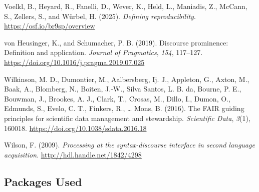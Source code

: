 \documentclass[
  letterpaper,
  DIV=11,
  numbers=noendperiod]{scrartcl}
\newlength{\cslhangindent}
\newenvironment{CSLReferences}[2] %
 {\begin{list}{}{%
  \setlength{\itemindent}{0pt}
  \setlength{\leftmargin}{0pt}
  \setlength{\parsep}{0pt}
  \ifodd #1
   \setlength{\leftmargin}{\cslhangindent}
   \setlength{\itemindent}{-1\cslhangindent}
  \fi
  \setlength{\itemsep}{#2\baselineskip}}}
 {\end{list}}
\begin{document}
\begin{CSLReferences}{1}{0}
Voelkl, B., Heyard, R., Fanelli, D., Wever, K., Held, L., Maniadis, Z.,
McCann, S., Zellers, S., and Würbel, H. (2025). \emph{Defining
reproducibility}. \url{https://osf.io/br9sp/overview}

{von Heusinger, K., and Schumacher, P. B.} (2019). Discourse prominence:
Definition and application. \emph{Journal of Pragmatics}, \emph{154},
117--127. \url{https://doi.org/10.1016/j.pragma.2019.07.025}

{Wilkinson, M. D., Dumontier, M., Aalbersberg, Ij. J., Appleton, G.,
Axton, M., Baak, A., Blomberg, N., Boiten, J.-W., Silva Santos, L. B.
da, Bourne, P. E., Bouwman, J., Brookes, A. J., Clark, T., Crosas, M.,
Dillo, I., Dumon, O., Edmunds, S., Evelo, C. T., Finkers, R., \ldots{}
Mons, B.} (2016). The FAIR guiding principles for scientific data
management and stewardship. \emph{Scientific Data}, \emph{3}(1), 160018.
\url{https://doi.org/10.1038/sdata.2016.18}

Wilson, F. (2009). \emph{Processing at the syntax-discourse interface in
second language acquisition}. \url{http://hdl.handle.net/1842/4298}

\end{CSLReferences}

\subsection{Packages Used}\label{sec-packages-used}
\end{document}
